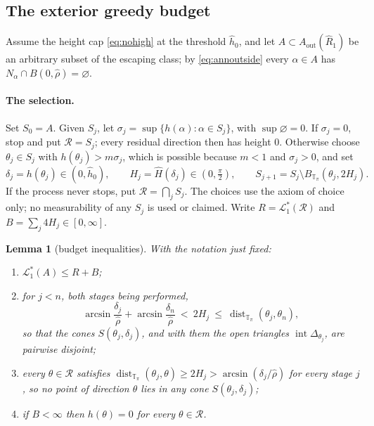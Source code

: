 \documentclass[11pt]{article}
\theoremstyle{plain}
\newtheorem{lemma}[theorem]{Lemma}
\theoremstyle{definition}
\theoremstyle{remark}
\newcommand{\Tp}{\mathbb{T}_{\pi}}
\newcommand{\Lone}{\mathcal{L}^{*}_{1}}
\newcommand{\Aout}{A_{\mathrm{out}}}
\begin{document}
\subsection{The exterior greedy budget}\label{sec:anngreedy}

Assume the height cap \eqref{eq:nohigh} at the threshold $\hat h_{0}$, and let
$A\subset\Aout(\hat R_{1})$ be an arbitrary subset of the escaping class; by
\eqref{eq:annoutside} every $\alpha\in A$ has
$N_{\alpha}\cap B(0,\hat\rho)=\varnothing$.

\paragraph{The selection.} Set $S_{0}=A$. Given $S_{j}$, let
$\sigma_{j}=\sup\{h(\alpha):\alpha\in S_{j}\}$, with $\sup\varnothing=0$. If
$\sigma_{j}=0$, stop and put $\mathcal R=S_{j}$; every residual direction then
has height $0$. Otherwise choose $\theta_{j}\in S_{j}$ with
$h(\theta_{j})>m\sigma_{j}$, which is possible because $m<1$ and
$\sigma_{j}>0$, and set
\begin{equation}\label{eq:annselect}
  \delta_{j}=h(\theta_{j})\in(0,\hat h_{0}),
  \qquad
  H_{j}=\hat H(\delta_{j})\in(0,\tfrac{\pi}{2}),
  \qquad
  S_{j+1}=S_{j}\setminus B_{\Tp}(\theta_{j},2H_{j}).
\end{equation}
If the process never stops, put $\mathcal R=\bigcap_{j}S_{j}$. The choices use
the axiom of choice only; no measurability of any $S_{j}$ is used or claimed.
Write $R=\Lone(\mathcal R)$ and $B=\sum_{j}4H_{j}\in[0,\infty]$.

\begin{lemma}[budget inequalities]\label{lem:annbudgetineq}
With the notation just fixed:
\begin{enumerate}
  \item[\textup{(B1)}] $\Lone(A)\le R+B$;
  \item[\textup{(B2)}] for $j<n$, both stages being performed,
    \[
      \arcsin\frac{\delta_{j}}{\hat\rho}+\arcsin\frac{\delta_{n}}{\hat\rho}
      \ <\ 2H_{j}\ \le\ \operatorname{dist}_{\Tp}(\theta_{j},\theta_{n}),
    \]
    so that the cones $S(\theta_{j},\delta_{j})$, and with them the open
    triangles $\operatorname{int}\Delta_{\theta_{j}}$, are pairwise disjoint;
  \item[\textup{(B3)}] every $\theta\in\mathcal R$ satisfies
    $\operatorname{dist}_{\Tp}(\theta_{j},\theta)\ge2H_{j}
    >\arcsin(\delta_{j}/\hat\rho)$ for every stage $j$, so no point of
    direction $\theta$ lies in any cone $S(\theta_{j},\delta_{j})$;
  \item[\textup{(B4)}] if $B<\infty$ then $h(\theta)=0$ for every
    $\theta\in\mathcal R$.
\end{enumerate}
\end{lemma}
\end{document}

